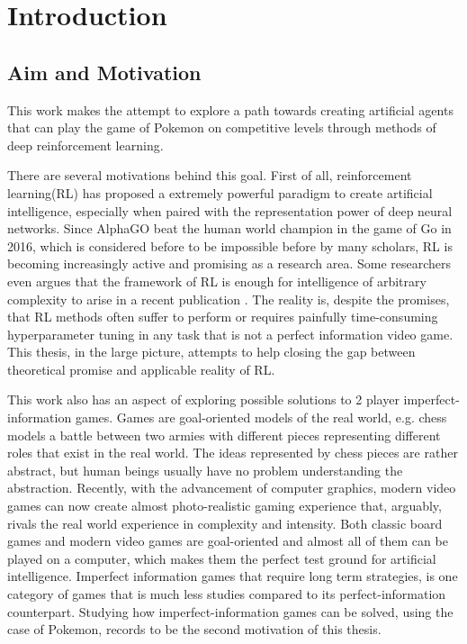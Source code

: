 \chapter{Introduction}
\section{Aim and Motivation} 
 This work makes the attempt to explore a path towards creating artificial
agents that can play the game of Pokemon on competitive levels through
methods of deep reinforcement learning. 

There are several motivations behind this goal. First of all, reinforcement
    learning(RL) has proposed a extremely powerful paradigm to create
    artificial intelligence, especially when paired with the representation
    power of deep neural networks. Since AlphaGO beat the human
    world champion in the game of Go in 2016, which is considered before to be
    impossible before by many scholars, RL is becoming increasingly active and
    promising as a research area. Some researchers even argues that the
    framework of RL is enough for intelligence of arbitrary complexity to arise
    in a recent publication . The reality is, despite the
    promises, that RL methods often suffer to perform or requires painfully
    time-consuming hyperparameter tuning in any task that is not a perfect
    information video game. This thesis, in the large picture, attempts to help
    closing the gap between theoretical promise and applicable reality of RL. 

This work also has an aspect of exploring possible solutions to 2 player
    imperfect-information games. Games are goal-oriented models of the real
    world, e.g. chess models a battle between two armies with different pieces
    representing different roles that exist in the real world.  The ideas
    represented by chess pieces are rather abstract, but human beings usually
    have no problem understanding the abstraction.  Recently, with the
    advancement of computer graphics, modern video games can now create almost
    photo-realistic gaming experience that, arguably, rivals the real world
    experience in complexity and intensity. Both classic board games and modern
    video games are goal-oriented and almost all of them can be played on a
    computer, which makes them the perfect test ground for artificial
    intelligence. Imperfect information games that require long term
    strategies, is one category of games that is much less studies compared to
    its perfect-information counterpart. Studying how imperfect-information
    games can be solved, using the case of Pokemon, records to be the second
    motivation of this thesis.
    
